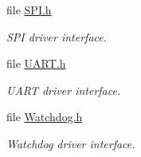\begin{DoxyCompactItemize}
file \hyperlink{_s_p_i_8h}{S\+P\+I.\+h}
\begin{DoxyCompactList}\small\item\em S\+P\+I driver interface. \end{DoxyCompactList}\item 
file \hyperlink{_u_a_r_t_8h}{U\+A\+R\+T.\+h}
\begin{DoxyCompactList}\small\item\em U\+A\+R\+T driver interface. \end{DoxyCompactList}\item 
file \hyperlink{_watchdog_8h}{Watchdog.\+h}
\begin{DoxyCompactList}\small\item\em Watchdog driver interface. \end{DoxyCompactList}\end{DoxyCompactItemize}
